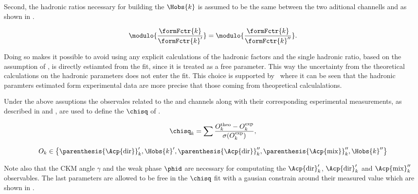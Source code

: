 \noindent Second, the hadronic ratios necessary for building the $\Hobs{k}$ is assumed to be the same between
the two aditional channells \BsJpsiKst and \BdJpsiRho as shown in .

\begin{equation}
  \centering
  \modulo{ \frac{\formFctr{k}}{\formFctr{k}'}  } =
  \modulo{ \frac{\formFctr{k}}{\formFctr{k}''}  }.
  \label{had_ratios_assuption}
\end{equation}

\noindent Doing so makes it possible to avoid using any explicit calculations of the hadronic factors
and the single hadronic ratio, based on the assumption of , is directly
estiamted from the fit, since it is treated as a free parameter. This way the uncertainty from the theoretical
calculations on the hadronic parameters does not enter the fit. This choice is supported by~\cite{DeBruyn-thesis}
where it can be seen that the hadronic paramters estimated form experimental data are more precise
that those coming from theopretical calculalations.

Under the above assuptions the observales related to the \BsJpsiKst and \BdJpsiRho channels along
with their corresponding esperimental measurements, as described in  and
, are used to define the $\chisq$ of .

\begin{equation}
  \centering
  \chisq_k = \sum \frac{O^{\rm theo}_k - O^{\rm exp}_k} {\sigma(O^{\rm exp}_k)},
  \label{chisq_form}
\end{equation}


\begin{equation}
  \centering
  O_k \in \left\{ \parenthesis{\Acp{\rm dir}}'_k, \Hobs{k}', \parenthesis{\Acp{\rm dir}}''_k, \parenthesis{\Acp{\rm mix}}''_k, \Hobs{k}'' \right\}
  \label{chisq_form_with}
\end{equation}

\noindent Note also that the CKM angle $\gamma$ and the weak phase $\phid$ are necessary for computating the ${\Acp{\rm dir}}'_k$,
${\Acp{\rm dir}}'_k$ and ${\Acp{\rm mix}}''_k$ observables. The last parameters are allowed to be free in the
$\chisq$ fit with a gausian constrain around their measured value which are shown in .

